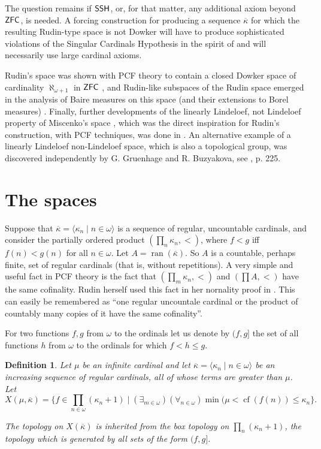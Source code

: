 \documentclass{amsart}
\newtheorem{definition}[theorem]{Definition}
\theoremstyle{remark}
\DeclareMathOperator{\zfc}{\sf ZFC}
\DeclareMathOperator{\ssh}{\sf SSH}
\DeclareMathOperator{\cf}{cf}
\DeclareMathOperator{\ran}{ran}
\renewcommand\mid{\mathrel{|}\allowbreak}
\begin{document}
  The question remains if \(\ssh\), or, for that matter, any additional 
  axiom beyond \(\zfc\),  is needed. A forcing construction for producing 
  a sequence \(\overline\kappa\)
  for which the resulting Rudin-type space is not Dowker will have to produce sophisticated violations of the Singular Cardinals Hypothesis in the spirit of \cite{gitik-shelah} and will necessarily use large cardinal axioms. 


  \medskip
  
  
  Rudin's space was shown with PCF theory to contain a closed Dowker space of cardinality \(\aleph_{\omega+1}\) in \(\zfc\) \cite{kojsh}, and Rudin-like subspaces of the Rudin space emerged in the analysis of Baire measures on this space (and their extensions to Borel measures) \cite{kojmich}. Finally, further developments of the linearly Lindeloef, not Lindeloef property of Miscenko's space \cite{miscenko}, which was the direct inspiration for Rudin's construction, with PCF techniques, was done in \cite{kojlub}. An alternative example of a linearly Lindeloef non-Lindeloef space, which is also a topological group, was discovered independently by G. Gruenhage and R. Buzyakova, see \cite{open2}, p. 225.

\section{The spaces}
Suppose that \(\overline \kappa=\langle \kappa_{n}\mid n\in \omega\rangle\) is a
sequence of regular, uncountable cardinals,
and consider the partially ordered product \((\prod_n \kappa_{n},<)\), where \(f<g\) iff
\(f(n)<g(n)\) for all \(n\in \omega\). 
Let \(A=\ran(\overline \kappa)\). So \(A\) is a countable, perhaps finite, set of regular
cardinals (that is, without repetitions). A very simple and useful fact in PCF
theory is the fact that \((\prod_{m}\kappa_{n},<)\) and \((\prod A,<)\) have the same
cofinality.  Rudin herself used this fact in her nornality proof in \cite{rudin}.
This can easily be remembered as ``one regular uncountale cardinal or the
product of countably many copies of it have the same cofinality''.


For two functions \(f,g\) from \(\omega\) to the ordinals  let us denote by \((f,g]\) the set of all functions \(h\) from \(\omega\) to the ordinals for which \(f<h\le g\).


\begin{definition}\label{def}
Let \(\mu\) be an infinite cardinal and let \(\overline \kappa=\langle \kappa_{n}\mid n \in \omega\rangle\) be an increasing 
sequence of regular cardinals, all of whose terms  are greater than  \(\mu\). Let
\[X(\mu,\overline \kappa)=\{f\in \prod_{n\in \omega}(\kappa_{n}+1)\mid(\exists_{m\in \omega})(\forall_{n\in \omega}) \min (\mu< \cf(f(n))\le \kappa_{n}\}.\]

The topology on \(X(\overline \kappa)\) is inherited from the box topology on \(\prod_{n}(\kappa_{n}+1)\), the topology which is generated by all sets of the form \((f,g]\).
\end{definition}
\end{document}
